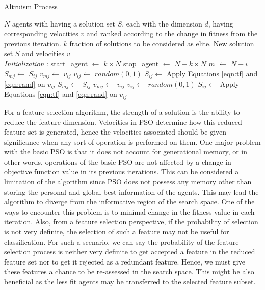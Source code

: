 \documentclass[final,3p,times]{elsarticle}
\begin{document}
\begin{algorithm}[ht!]
      \caption{Altruism Process}
    \label{alg:altPSO}
     \begin{algorithmic}[1]
     \renewcommand{\algorithmicrequire}{\textbf{Input:}}
     \renewcommand{\algorithmicensure}{\textbf{Output:}}
     \REQUIRE $N$ agents with having a solution set $S$, each with the dimension $d$, having corresponding velocities $v$ and ranked according to the change in fitness from the previous iteration. $k$ fraction of solutions to be considered as elite.
     \ENSURE  New solution set $S$ and velocities $v$
     \\ \textit{Initialization} :
     \STATE start\_agent $\gets$ $k\times N$
     \STATE stop\_agent $\gets$ $N-k\times N$
        \STATE $m$ $\gets$ $N-i$
                \STATE $S_{mj}\gets$ $S_{ij}$
                \STATE $v_{mj}\gets$ $v_{ij}$
                \STATE $v_{ij}\gets$ $random(0,1)$
                \STATE $S_{ij}\gets$ Apply Equations \ref{eqn:tf} and \ref{eqn:rand} on $v_{ij}$
                \ENDIF
            \ELSE
                \STATE $S_{mj}\gets$ $S_{ij}$
                \STATE $v_{mj}\gets$ $v_{ij}$
                \STATE $v_{ij}\gets$ $random(0,1)$
                \STATE $S_{ij}\gets$ Apply Equations \ref{eqn:tf} and \ref{eqn:rand} on $v_{ij}$
                \ENDIF
            \ENDIF
        \ENDFOR
    \ENDFOR
     \end{algorithmic} 

 \end{algorithm}
For a feature selection algorithm, the strength of a solution is the ability to reduce the feature dimension. Velocities in PSO determine how this reduced feature set is generated, hence the velocities associated should be given significance when any sort of {operation is performed on them.} One major problem with {the basic} PSO is that it does not account for generational memory, or in other words, operations of the basic PSO are not affected by a change in objective function value in its previous iterations. This can be considered a limitation of the algorithm since PSO does not possess any memory other than storing the personal and global best information of the agents. This may lead the algorithm to diverge from the informative region of the search space. One of the ways to encounter this problem is to minimal change {in} the fitness value in each iteration. {Also,} from a feature selection perspective, if the probability of selection is not very definite, the selection of such a feature may not be useful for classification. For such a scenario, we can say the probability of the feature selection {process} is {neither} very definite to get accepted a feature in the reduced feature set nor to get {it} rejected as a redundant feature. {Hence, we must} give these features a chance to be re-assessed in the search {space. This might }be also beneficial as the less fit agents may be transferred to the selected feature subset.
\end{document}
